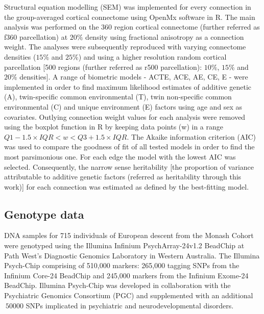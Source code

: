 Structural equation modelling (SEM) was implemented for every connection in the group-averaged cortical connectome using OpenMx software \citep{Boker2011,Neale2016} in R. The main analysis was performed on the 360 region \citep{Glasser2016} cortical connectome (further referred as f360 parcellation) at $20\%$ density using fractional anisotropy as a connection weight. The analyses were subsequently reproduced with varying connectome densities ($15\%$ and $25\%$) and using a higher resolution random cortical parcellation [500 regions (further referred as r500 parcellation): $10\%$, $15\%$ and $20\%$ densities]. A range of biometric models - ACTE, ACE, AE, CE, E - were implemented in order to find maximum likelihood estimates of additive genetic (A), twin-specific common environmental (T), twin non-specific common environmental (C) and unique environment (E) factors using age and sex as covariates. Outlying connection weight values for each analysis were removed using the boxplot function in R by keeping data points (w) in a range $Q1-1.5 \times IQR< w <Q3+1.5 \times IQR$. The Akaike information criterion (AIC) \citep{Akaike1998} was used to compare the goodness of fit of all tested models in order to find the most parsimonious one. For each edge the model with the lowest AIC was selected. Consequently, the narrow sense heritability [the proportion of variance attributable to additive genetic factors (referred as heritability through this work)] for each connection was estimated as defined by the best-fitting model. 

\subsection{Genotype data} 

DNA samples for 715 individuals of European descent from the Monash Cohort were genotyped using the Illumina Infinium PsychArray-24v1.2 BeadChip at Path West’s Diagnostic Genomics Laboratory in Western Australia. The Illumina Psych-Chip comprising of 510,000 markers: 265,000 tagging SNPs from the Infinium Core-24 BeadChip and 245,000 markers from the Infinium Exome-24 BeadChip. Illumina Psych-Chip was developed in collaboration with the Psychiatric Genomics Consortium (PGC) and supplemented with an additional $~50000$ SNPs implicated in psychiatric and neurodevelopmental disorders. 

